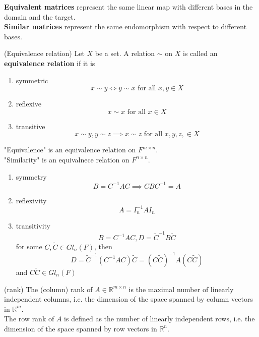 \begin{remark}
    \textbf{Equivalent matrices} represent the same linear map with different bases in the domain and the target.  \\
    
    \textbf{Similar matrices} represent the same endomorphism with respect to different bases. 
\end{remark}

\begin{definition}
    (Equivalence relation) Let $X$ be a set. A relation $\sim$ on $X$ is called an \textbf{equivalence relation} if it is 
    \begin{enumerate}
        \item symmetric 
        \[
            x \sim y \iff y \sim x \text{ for all } x, y \in X
        \]
        \item reflexive
        \[
            x \sim x \text{ for all } x \in X
        \]
        \item transitive
        \[
        x \sim y, y \sim z \implies x \sim z \text{ for all }x, y, z, \in X
        \]
    \end{enumerate}
\end{definition}

\begin{remark}
    "Equivalence" is an equivalence relation on $F^{m \times n}$. \\

    "Similarity" is an equivalnece relation on $F^{n \times n}$. 
    \begin{enumerate}
        \item symmetry
        \[
            B = C^{-1} AC \implies CBC^{-1} = A
        \]
        \item reflexivity
        \[
            A = I_n^{-1} A I_n
        \]
        \item transitivity
        \[
            B = C^{-1}AC, D = \tilde{C}^{-1} B \tilde{C}
        \] for some $C, \tilde{C} \in Gl_n(F)$, then 
        \[
        D = \tilde{C}^{-1} (C^{-1}AC)\tilde{C} = (C \tilde{C})^{-1} A (C \tilde{C})
        \]
        and $C\tilde{C} \in Gl_n(F)$
    \end{enumerate}
\end{remark}

\begin{definition}
    (rank) The (column) rank of $A \in \mathbb{R}^{m \times n}$ is the maximal number of linearly independent columns, i.e. the dimension of the space spanned by column vectors in $\mathbb{R}^m$. \\

    The row rank of $A$ is defined as the number of linearly independent rows, i.e. the dimension of the space spanned by row vectors in $\mathbb{R}^n$.
\end{definition}

